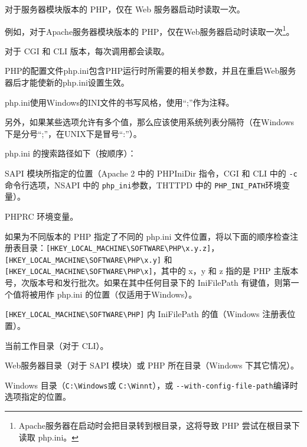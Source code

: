 \begin{compactitem}
\item 对于服务器模块版本的 PHP，仅在 Web 服务器启动时读取一次。

例如，对于Apache服务器模块版本的 PHP，仅在Web服务器启动时读取一次\footnote{Apache服务器在启动时会把目录转到根目录，这将导致 PHP 尝试在根目录下读取 php.ini。}。
\item 对于 CGI 和 CLI 版本，每次调用都会读取。
\end{compactitem}


PHP的配置文件php.ini包含PHP运行时所需要的相关参数，并且在重启Web服务器后才能使新的php.ini设置生效。


php.ini使用Windows的INI文件的书写风格，使用“;”作为注释。

另外，如果某些选项允许有多个值，那么应该使用系统列表分隔符（在Windows下是分号“;”，在UNIX下是冒号“:”）。



php.ini 的搜索路径如下（按顺序）：

\begin{compactitem}
\item SAPI 模块所指定的位置（Apache 2 中的 PHPIniDir 指令，CGI 和 CLI 中的 \texttt{-c} 命令行选项，NSAPI 中的 \texttt{php\_ini}参数，THTTPD 中的 \texttt{PHP\_INI\_PATH}环境变量）。
\item PHPRC 环境变量。
\item 如果为不同版本的 PHP 指定了不同的 php.ini 文件位置，将以下面的顺序检查注册表目录：\texttt{[HKEY\_LOCAL\_MACHINE{\textbackslash}SOFTWARE{\textbackslash}PHP{\textbackslash}x.y.z]}，\texttt{[HKEY\_LOCAL\_MACHINE{\textbackslash}SOFTWARE{\textbackslash}PHP{\textbackslash}x.y]} 和 \texttt{[HKEY\_LOCAL\_MACHINE{\textbackslash}SOFTWARE{\textbackslash}PHP{\textbackslash}x]}，其中的 x，y 和 z 指的是 PHP 主版本号，次版本号和发行批次。如果在其中任何目录下的 IniFilePath 有键值，则第一个值将被用作 php.ini 的位置（仅适用于Windows）。
\item \texttt{[HKEY\_LOCAL\_MACHINE{\textbackslash}SOFTWARE{\textbackslash}PHP]} 内 IniFilePath 的值（Windows 注册表位置）。
\item 当前工作目录（对于 CLI）。
\item Web服务器目录（对于 SAPI 模块）或 PHP 所在目录（Windows 下其它情况）。
\item Windows 目录（\texttt{C:{\textbackslash}Windows}或 \texttt{C:{\textbackslash}Winnt}），或 \texttt{-\/-with-config-file-path}编译时选项指定的位置。
\end{compactitem}

